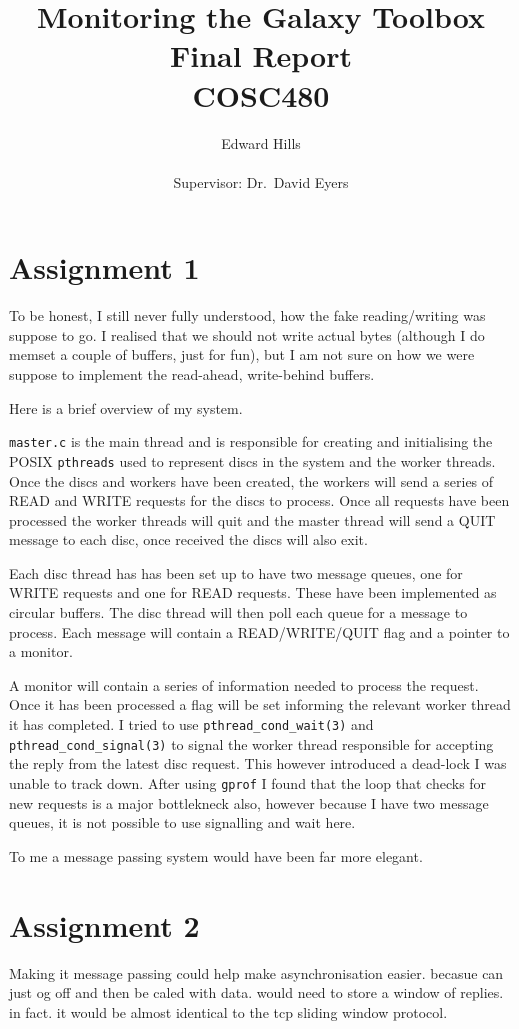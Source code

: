 \documentclass[12pt]{article}
\title{Monitoring the Galaxy Toolbox \\ Final Report \\ COSC480}
\author{Edward Hills \\ \\ Supervisor: Dr.\ David Eyers}
\begin{document}
\vspace{-1cm}

\maketitle

\section{Assignment 1}

To be honest, I still never fully understood, how the fake reading/writing was suppose to go. I realised that we should not write actual bytes (although I do memset a couple of buffers, just for fun), but I am not sure on how we were suppose to implement the read-ahead, write-behind buffers.

Here is a brief overview of my system.

\texttt{master.c} is the main thread and is responsible for creating and initialising the POSIX \texttt{pthreads} used to represent discs in the system and the worker threads. Once the discs and workers have been created, the workers will send a series of READ and WRITE requests for the discs to process. Once all requests have been processed the worker threads will quit and the master thread will send a QUIT message to each disc, once received the discs will also exit.

Each disc thread has has been set up to have two message queues, one for WRITE requests and one for READ requests. These have been implemented as circular buffers. The disc thread will then poll each queue for a message to process. Each message will contain a READ/WRITE/QUIT flag and a pointer to a monitor.

A monitor will contain a series of information needed to process the request. Once it has been processed a flag will be set informing the relevant worker thread it has completed. I tried to use \texttt{pthread\_cond\_wait(3)} and \texttt{pthread\_cond\_signal(3)} to signal the worker thread responsible for accepting the reply from the latest disc request. This however introduced a dead-lock I was unable to track down. After using \texttt{gprof} I found that the loop that checks for new requests is a major bottlekneck also, however because I have two message queues, it is not possible to use signalling and wait here. 

To me a message passing system would have been far more elegant.

\section{Assignment 2}

Making it message passing could help make asynchronisation easier. becasue can just og off and then be caled with data. would need to store a window of replies. in fact. it would be almost identical to the tcp sliding window protocol.
\end{document}
